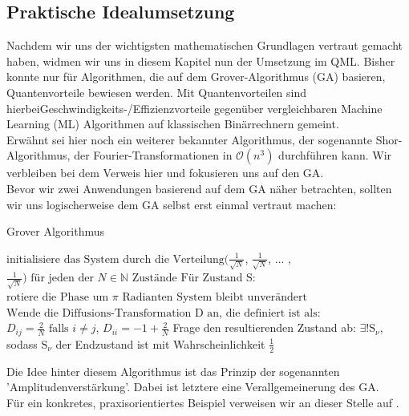 \subsection{Praktische Idealumsetzung}
Nachdem wir uns der wichtigsten mathematischen Grundlagen vertraut gemacht haben, widmen wir uns in
diesem Kapitel nun der Umsetzung im QML. Bisher konnte nur für Algorithmen, die auf dem Grover-Algorithmus (GA) basieren, Quantenvorteile bewiesen werden\cite{PartialQuantumSearchGrover}. Mit Quantenvorteilen sind hierbei\linebreak Geschwindigkeits-/Effizienzvorteile gegenüber vergleichbaren Machine Learning (ML) Algorithmen auf klassischen Binärrechnern gemeint.\\
Erwähnt sei hier noch ein weiterer bekannter Algorithmus, der sogenannte Shor-Algorithmus, der Fourier-Transformationen in $\mathcal{O}(n^3)$ durchführen kann\cite{ShorAlgorithm}. Wir verbleiben bei dem Verweis hier und fokusieren uns auf den GA.\\

Bevor wir zwei Anwendungen basierend auf dem GA näher betrachten, sollten wir uns logischerweise dem GA selbst erst einmal vertraut machen:\\

\begin{algorithm}
\caption{Grover Algorithmus\cite{FastQuantumAlgorithmGrover}}
\begin{algorithmic}[1]
\State $\text{initialisiere das System durch die Verteilung} (\frac{1}{\sqrt{N}}$, $\frac{1}{\sqrt{N}}$, ... , $\frac{1}{\sqrt{N}}) \text{ für jeden der }N \in \mathbb{N} \text{ Zustände}$
\State $\text{Für Zustand S:}$
\State $\text{rotiere die Phase um } \pi \text{ Radianten}$
\State $\text{System bleibt unverändert}$
\State $\text{Wende die Diffusions-Transformation D an, die definiert ist als:}$
\State $D_{ij} = \frac{2}{N} \text{ falls } i \neq j$, $D_{ii} = -1 + \frac{2}{N}$
\EndIf
\EndWhile
\State Frage den resultierenden Zustand ab:
\State $\exists! \text{S}_{\nu}$, sodass $\text{S}_{\nu}$ der Endzustand ist mit Wahrscheinlichkeit $\frac{1}{2}$
\EndIf
\EndProcedure
\end{algorithmic}
\end{algorithm}
Die Idee hinter diesem Algorithmus ist das Prinzip der sogenannten 'Amplitudenverstärkung'. Dabei ist letztere eine Verallgemeinerung des GA\cite{QuantumAmplitudeAmplificationBrassard}.\\
Für ein konkretes, praxisorientiertes Beispiel verweisen wir an dieser Stelle auf \cite{GroverExample}.
\newpage
